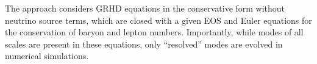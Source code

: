 %
The approach considers \ac{GRHD} equations in the conservative form 
without neutrino source terms, 
%
which are closed with a given \ac{EOS} and Euler equations for 
the conservation of baryon and lepton numbers.
%
Importantly, while modes of all scales are present in these equations, 
only ``resolved'' modes are evolved in numerical simulations. 


